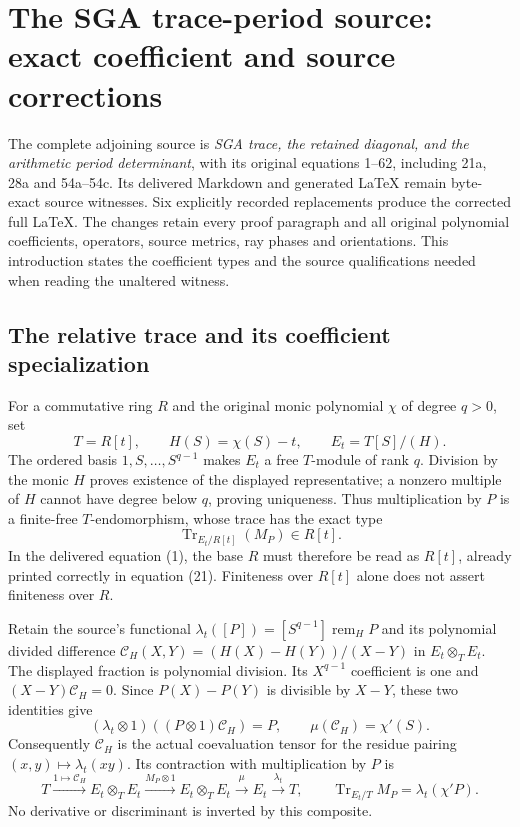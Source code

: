 \documentclass{article}
\begin{document}
\maketitle
\section{The SGA trace-period source: exact coefficient and source corrections}
\label{sec:sga-trace-period-source-corrections}

The complete adjoining source is \emph{SGA trace, the retained diagonal,
and the arithmetic period determinant}, with its original equations
1--62, including 21a, 28a and 54a--54c.  Its delivered Markdown and
generated LaTeX remain byte-exact source witnesses.  Six explicitly
recorded replacements produce the corrected full LaTeX.  The changes
retain every proof paragraph and all original polynomial coefficients,
operators, source metrics, ray phases and orientations.  This introduction
states the coefficient types and the source qualifications needed when
reading the unaltered witness.

\subsection{The relative trace and its coefficient specialization}

For a commutative ring $R$ and the original monic polynomial $\chi$ of
degree $q>0$, set
\[
 T=R[t],\qquad H(S)=\chi(S)-t,\qquad E_t=T[S]/(H).
 \tag{SGAC1}
\]
The ordered basis $1,S,\ldots,S^{q-1}$ makes $E_t$ a free
$T$-module of rank $q$.  Division by the monic $H$ proves existence
of the displayed representative; a nonzero multiple of $H$ cannot
have degree below $q$, proving uniqueness.  Thus multiplication by
$P$ is a finite-free $T$-endomorphism, whose trace has the exact type
\[
 \operatorname{Tr}_{E_t/R[t]}(M_P)\in R[t].
 \tag{SGAC2}
\]
In the delivered equation (1), the base $R$ must therefore be read as
$R[t]$, already printed correctly in equation (21).  Finiteness over
$R[t]$ alone does not assert finiteness over $R$.

Retain the source's functional
$\lambda_t([P])=[S^{q-1}]\operatorname{rem}_H P$ and its polynomial
divided difference $\mathcal C_H(X,Y)=(H(X)-H(Y))/(X-Y)$ in
$E_t\otimes_T E_t$.  The displayed fraction is polynomial division.
Its $X^{q-1}$ coefficient is one and
$(X-Y)\mathcal C_H=0$.  Since $P(X)-P(Y)$ is divisible by $X-Y$,
these two identities give
\[
 (\lambda_t\otimes1)((P\otimes1)\mathcal C_H)=P,
 \qquad \mu(\mathcal C_H)=\chi'(S).
 \tag{SGAC3}
\]
Consequently $\mathcal C_H$ is the actual coevaluation tensor for
the residue pairing $(x,y)\mapsto\lambda_t(xy)$.  Its contraction
with multiplication by $P$ is
\[
 T\xrightarrow{1\mapsto\mathcal C_H}E_t\otimes_T E_t
 \xrightarrow{M_P\otimes1}E_t\otimes_T E_t
 \xrightarrow{\mu}E_t\xrightarrow{\lambda_t}T,
 \qquad
 \operatorname{Tr}_{E_t/T}M_P=\lambda_t(\chi'P).
 \tag{SGAC4}
\]
No derivative or discriminant is inverted by this composite.
\end{document}
